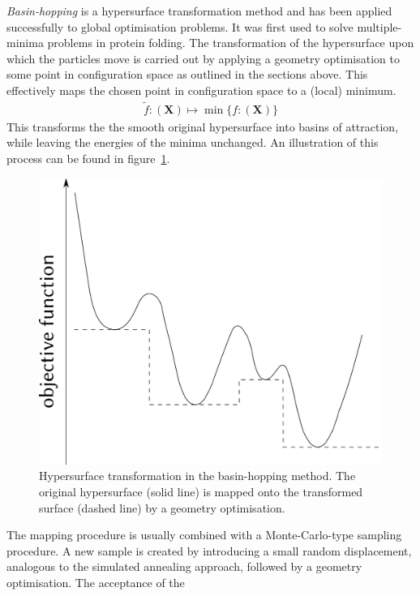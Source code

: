 \textit{Basin-hopping} is a hypersurface transformation method and has been
applied successfully to global optimisation
problems.\autocite{Wales_GlobalOptimizationBasinHopping_1997,Doye_Structuralconsequencesrange_1997,Doye_Modelingstructureclusters_2001}
It was first used to solve multiple-minima problems in protein
folding.\autocite{Li_MonteCarlominimizationapproach_1987} The transformation of
the hypersurface upon which the particles move is carried out by applying a
geometry optimisation to some point in configuration space as outlined in the
sections above. This effectively maps the chosen point in configuration space to
a (local) minimum.
%
\begin{align}
    \widetilde{f} : (\mathbf{X}) \mapsto \min\{f : (\mathbf{X})\}
\end{align}
%
This transforms the the smooth original hypersurface into basins of attraction,
while leaving the energies of the minima unchanged. An illustration of this
process can be found in figure~\ref{fig:PEStransform}.
%
\begin{figure}[htb]\centering
    \includegraphics[width=.8\textwidth]{other-pics/basin-hopping.pdf}
    \caption{Hypersurface transformation in the basin-hopping method. The original hypersurface (solid line) is mapped onto the transformed surface (dashed line) by a geometry optimisation.}
    \label{fig:PEStransform}
\end{figure}
%
The mapping procedure is usually combined with a Monte-Carlo-type sampling
procedure.\autocite{Wales_GlobalOptimizationBasinHopping_1997} A new sample is
created by introducing a small random displacement, analogous to the simulated
annealing approach, followed by a geometry optimisation. The acceptance of the

